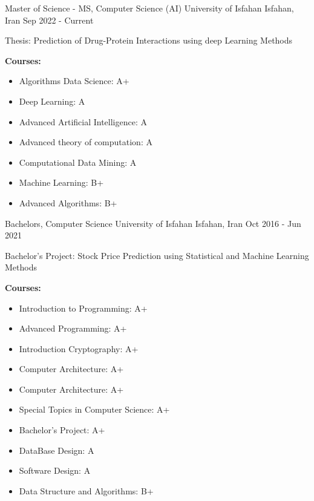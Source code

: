 

\begin{cventries}

  \cventry
    {Master of Science - MS, Computer Science (AI)} %
    {University of Isfahan} %
    {Isfahan, Iran} %
    {Sep 2022 - Current} %
    {
      \begin{cvitems} %
      		Thesis: Prediction of Drug-Protein Interactions using deep Learning Methods
      	\item {\textbf{Courses:}}
      	\begin{itemize}
      		\item Algorithms Data Science: A+
      		\item Deep Learning: A
      		\item Advanced Artificial Intelligence: A
      		\item Advanced theory of computation: A
      		\item Computational Data Mining: A
      		\item Machine Learning: B+
      		\item Advanced Algorithms: B+
      	\end{itemize}
      \end{cvitems}
    }
    
  \cventry
    {Bachelors, Computer Science} %
    {University of Isfahan} %
    {Isfahan, Iran} %
    {Oct 2016 - Jun 2021} %
    {
    	\begin{cvitems} %
    		\item Bachelor's Project: Stock Price Prediction using Statistical and Machine Learning Methods 
    		\item {\textbf{Courses:}}
    		\begin{itemize}
    			\item Introduction to Programming: A+
    			\item Advanced Programming: A+
    			\item Introduction Cryptography: A+
    			\item Computer Architecture: A+
    			\item Computer Architecture: A+
    			\item Special Topics in Computer Science: A+
    			\item Bachelor's Project: A+
    			\item DataBase Design: A
    			\item Software Design: A
    			\item Data Structure and Algorithms: B+
    		\end{itemize}
    	\end{cvitems}
    }
\end{cventries}
